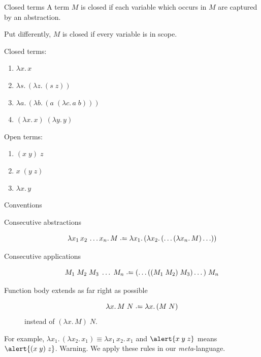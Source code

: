 \begin{frame}{Closed terms}
  A term $M$ is \alert{closed} if each variable which occurs in $M$ are captured by an abstraction.

  Put differently, $M$ is closed if every variable is in scope.

  Closed terms:
  \begin{enumerate}
    \item $\lambda x.\, x$
    \item $\lambda s.\,(\lambda z.\, (s \;z))$
    \item $\lambda a.\,(\lambda b.\, (a\;(\lambda c.\, a\; b)))$
    \item $(\lambda x.\, x)\;(\lambda y.\, y)$
  \end{enumerate}
  Open terms:
  \begin{enumerate}
    \item $(x\;y)\;z$
    \item $x\;(y\; z)$
    \item $\lambda x.\, y$
  \end{enumerate}
\end{frame}

\begin{frame}{Conventions}
  \begin{description}
    \item[Consecutive abstractions]
      \[
        \lambda x_1\,x_2\,\ldots x_n.\, M \defeq \lambda x_1.\,(\lambda x_2.\,(\ldots (\lambda x_n.\, M)\ldots))
      \]
    \item[Consecutive applications]
      \[
        M_1\;M_2\; M_3\; \dots\;M_n \defeq (\dots((M_1\;M_2)\;M_3) \dots )\; M_n
      \]
    \item[Function body extends as far right as possible]
      \[
        \lambda x.\, M\;N \defeq \lambda x.\,(M\; N)
      \]
      instead of $(\lambda x.\,M)\; N$.
  \end{description}
  For example, 
      $\lambda x_1.\,(\lambda x_2.\, x_1) \equiv \lambda x_1\,x_2.\,x_1$
      and
      $\alert{x\;y\;z}$ means $\alert{(x\; y)\;z}$. 
  \alert{Warning}. We apply these rules in our \emph{meta}-language.
\end{frame}

